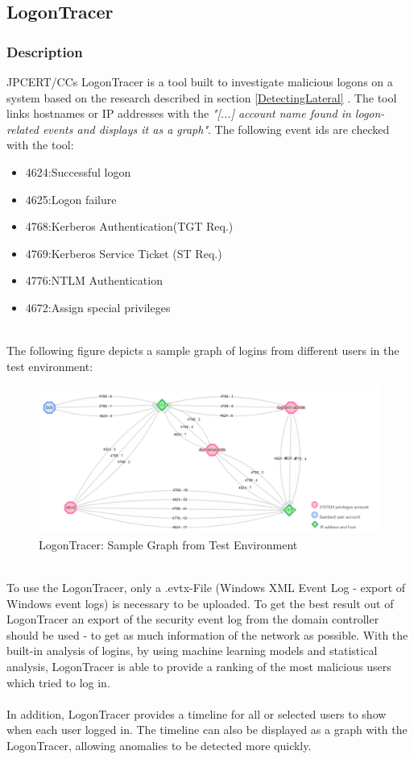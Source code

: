 \subsection{LogonTracer}
\subsubsection{Description}
JPCERT/CCs LogonTracer is a tool built to investigate malicious logons on a system based on the research described in section \ref{DetectingLateral} . The tool links hostnames or IP addresses with the \textit{"[...] account name found in logon-related events and displays it as a graph"}. \cite{LogonTracer} The following event ids are checked with the tool: 
\ \\
\begin{multicols}{2}
    \begin{itemize}
        \item 4624:Successful logon
        \item 4625:Logon failure
        \item 4768:Kerberos Authentication(TGT Req.)
        \item 4769:Kerberos Service Ticket (ST Req.)
        \item 4776:NTLM Authentication
        \item 4672:Assign special privileges
    \end{itemize}
\end{multicols} \ \\
The following figure depicts a sample graph of logins from different users in the test environment:
\begin{figure}[H]
    \centering
    \includegraphics[width=0.8\linewidth]{assets/LogonTracer/LogonTrace_LogFarm.png}
    \caption{LogonTracer: Sample Graph from Test Environment}
    \label{fig:LogonTracerSample}
\end{figure}
\ \\
To use the LogonTracer, only a .evtx-File (Windows XML Event Log - export of Windows event logs) is necessary to be uploaded. To get the best result out of LogonTracer an export of the security event log from the domain controller should be used - to get as much information of the network as possible. With the built-in analysis of logins, by using machine learning models and statistical analysis, LogonTracer is able to provide a ranking of the most malicious users which tried to log in. \cite{LogonTracerBlog}
\\\\
In addition, LogonTracer provides a timeline for all or selected users to show when each user logged in. The timeline can also be displayed as a graph with the LogonTracer, allowing anomalies to be detected more quickly.

